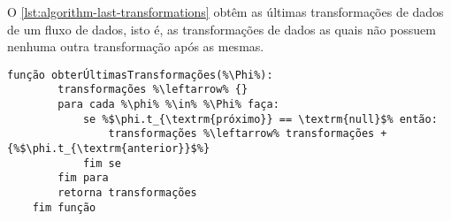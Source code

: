 O \autoref{lst:algorithm-last-transformations} obtêm as últimas transformações de dados de um fluxo de dados, isto é, as transformações de dados as quais não possuem nenhuma outra transformação após as mesmas.

\begin{lstlisting}[language=pseudocodigo,label=lst:algorithm-last-transformations,caption={[Detecção das últimas transformações de dados]Detecção das útimas transformações de dados em uma especificação de fluxo de dados.}]
    função obterÚltimasTransformações(%\Phi%):
        transformações %\leftarrow% {}
        para cada %\phi% %\in% %\Phi% faça:
            se %$\phi.t_{\textrm{próximo}} == \textrm{null}$% então:
                transformações %\leftarrow% transformações + {%$\phi.t_{\textrm{anterior}}$%}
            fim se
        fim para
        retorna transformações
    fim função
\end{lstlisting}




